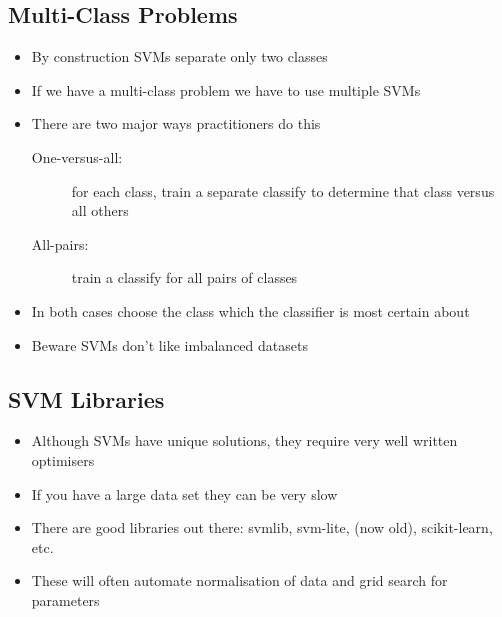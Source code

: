 
\begin{slide}
\section[-2]{Multi-Class Problems}

\begin{PauseHighLight}
  \begin{itemize}
  \item By construction SVMs separate only two classes\pause
  \item If we have a multi-class problem we have to use multiple
    SVMs\pause
  \item There are two major ways practitioners do this
    \begin{description}
    \item[One-versus-all:] for each class, train a separate classify to
      determine that class versus all others\pause
    \item[All-pairs:] train a classify for all pairs of classes\pause
    \end{description}
  \item In both cases choose the class which the classifier is most
    certain about\pause
  \item Beware SVMs don't like imbalanced datasets\pause
  \end{itemize}
\end{PauseHighLight}

\end{slide}



\begin{slide}
\section{SVM Libraries}

\begin{PauseHighLight}
  \begin{itemize}
  \item Although SVMs have unique solutions, they require very well
    written optimisers\pause
  \item If you have a large data set they can be very slow\pause
  \item There are good libraries out there: svmlib, svm-lite, (now old),
    scikit-learn, etc.\pause
  \item These will often automate normalisation of data and grid search
    for parameters\pause
  \end{itemize}
\end{PauseHighLight}

\end{slide}




